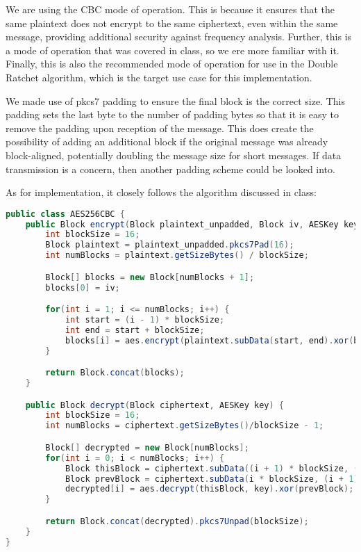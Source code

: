 We are using the CBC mode of operation. This is because it ensures that 
the same plaintext does not encrypt to the same ciphertext, even within the same 
message, providing additional security against frequency analysis. Further,
this is a mode of operation that was covered in class, so we ere more familiar with it. 
Finally, this is also the recommended mode of operation for use in the Double Ratchet algorithm,
which is the target use case for this implementation.

We made use of pkcs7 padding to ensure the final block is the correct size. This padding sets the last byte 
to the number of padding bytes so that it is easy to remove the padding upon reception of the message. This does 
create the possibility of adding an additional block if the original message was already block-aligned, potentially doubling the 
message size for short messages. If data transmission is a concern, then another padding scheme could be looked into.

As for implementation, it closely follows the algorithm discussed in class:

\begin{lstlisting}[language=Java]
public class AES256CBC {
    public Block encrypt(Block plaintext_unpadded, Block iv, AESKey key) {
        int blockSize = 16;
        Block plaintext = plaintext_unpadded.pkcs7Pad(16);
        int numBlocks = plaintext.getSizeBytes() / blockSize;

        Block[] blocks = new Block[numBlocks + 1];
        blocks[0] = iv;

        for(int i = 1; i <= numBlocks; i++) {
            int start = (i - 1) * blockSize;
            int end = start + blockSize;
            blocks[i] = aes.encrypt(plaintext.subData(start, end).xor(blocks[i-1]), key);
        }

        return Block.concat(blocks);
    }

    public Block decrypt(Block ciphertext, AESKey key) {
        int blockSize = 16;
        int numBlocks = ciphertext.getSizeBytes()/blockSize - 1;

        Block[] decrypted = new Block[numBlocks];
        for(int i = 0; i < numBlocks; i++) {
            Block thisBlock = ciphertext.subData((i + 1) * blockSize, (i + 2) * blockSize);
            Block prevBlock = ciphertext.subData(i * blockSize, (i + 1) * blockSize);
            decrypted[i] = aes.decrypt(thisBlock, key).xor(prevBlock);
        }

        return Block.concat(decrypted).pkcs7Unpad(blockSize);
    }
}
\end{lstlisting}
